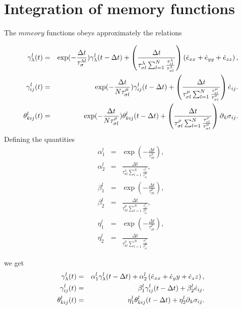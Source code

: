 \documentclass[11pt]{article}
\begin{document}
\section*{Integration of memory functions}
The $mmeory$ functions  obeys approximately the relations

\begin{eqnarray}
\gamma^l_{\lambda}(t) & = &
            \exp(-\frac{\Delta t}{\tau^{\lambda l}_{\sigma}})\gamma^l_{\lambda}(t-\Delta t)
            +\left(\frac{\Delta t}{\tau^{\lambda}_{\sigma l}
            \sum_{l=1}^N\frac{\tau^{\lambda}_{\epsilon l}}{\tau^{\lambda}_{\sigma l}}}\right)
             \left(\dot{e}_{xx}+ \dot{e}_{yy}+\dot{e}_{zz}\right) ,\nonumber\\
\gamma^l_{ij}(t) & = &
            \exp(-\frac{\Delta t}{N\tau^{\mu}_{\sigma l}})\gamma^l_{ij}(t-\Delta t)
            + \left(\frac{\Delta t}{\tau^{\mu}_{\sigma l}
            \sum_{l=1}^N\frac{\tau^{\mu}_{\epsilon l}}{\tau^{\mu}_{\sigma l}}}\right) \dot{e}_{ij}.\nonumber\\
\theta^l_{kij}(t) & = &
            \exp(-\frac{\Delta t}{N\tau^{\rho}_{\sigma l}})\theta^l_{kij}(t-\Delta t)
            + \left(\frac{\Delta t}{\tau^{\rho}_{\sigma l}
            \sum_{l=1}^N\frac{\tau^{\rho}_{\epsilon l}}{\tau^{\mu}_{\sigma l}}}\right) \mbox{$\partial$}_k \sigma_{ij}.\nonumber\\
\end{eqnarray}
%
Defining the quantities
\begin{eqnarray}
\alpha^l_1 & = & \exp(-\frac{\Delta t}{\tau^{\lambda}_{\sigma l}}),\\
\alpha^l_2 & = & \frac{\Delta t}{\tau^{\lambda}_{\sigma l}\sum_{l=1}^N\frac{\tau^{\lambda}_{\epsilon l}}{\tau^{\lambda}_{\sigma l}}} ,\\
\beta^l_1  & = &\exp(-\frac{\Delta t}{\tau^{\mu}_{\sigma l}}) ,\\
\beta^l_2  & = &\frac{\Delta t}{\tau^{\mu}_{\sigma l}\sum_{l=1}^N\frac{\tau^{\mu}_{\epsilon l}}{\tau^{\mu}_{\sigma l}}},\\
\eta^l_1  & = &\exp(-\frac{\Delta t}{\tau^{\rho}_{\sigma l}}) ,\\
\eta^l_2  & = &\frac{\Delta t}{\tau^{\rho}_{\sigma l}\sum_{l=1}^N\frac{\tau^{\rho}_{\epsilon l}}{\tau^{\rho}_{\sigma l}}} 
\end{eqnarray}

%
we get
\begin{eqnarray}
\gamma^l_{\lambda}(t)  & = &\alpha^l_1 \gamma^l_{\lambda}(t-\Delta t) 
                        + \alpha^l_2\left( \dot{e}_{xx}+ \dot{e}_yy+\dot{e}_zz\right) ,\nonumber \\
\gamma^l_{ij}(t)      & = &\beta^l_1 \gamma^l_{ij}(t - \Delta t) 
                        + \beta^l_2\dot{e}_{ij}.\nonumber\\
\theta^l_{kij}(t)      & = &\eta^l_{1} \theta^l_{kij}(t - \Delta t) 
                        + \eta^l_2\mbox{$\partial$}_k \sigma_{ij}.\nonumber\\
\end{eqnarray}
%
\end{document}
